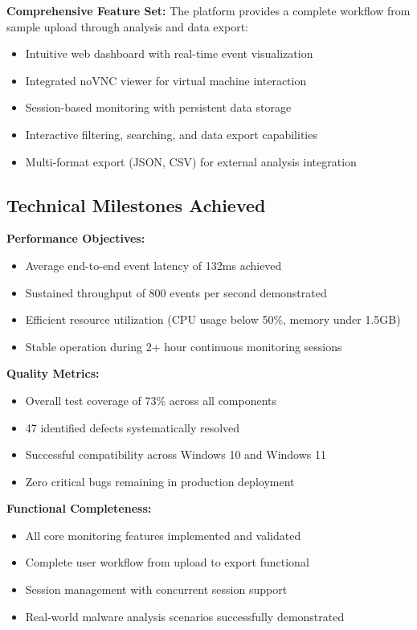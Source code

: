 \textbf{Comprehensive Feature Set:}
The platform provides a complete workflow from sample upload through analysis and data export:
\begin{itemize}
    \item Intuitive web dashboard with real-time event visualization
    \item Integrated noVNC viewer for virtual machine interaction
    \item Session-based monitoring with persistent data storage
    \item Interactive filtering, searching, and data export capabilities
    \item Multi-format export (JSON, CSV) for external analysis integration
\end{itemize}

\subsection{Technical Milestones Achieved}

\textbf{Performance Objectives:}
\begin{itemize}
    \item Average end-to-end event latency of 132ms achieved
    \item Sustained throughput of 800 events per second demonstrated
    \item Efficient resource utilization (CPU usage below 50\%, memory under 1.5GB)
    \item Stable operation during 2+ hour continuous monitoring sessions
\end{itemize}

\textbf{Quality Metrics:}
\begin{itemize}
    \item Overall test coverage of 73\% across all components
    \item 47 identified defects systematically resolved
    \item Successful compatibility across Windows 10 and Windows 11
    \item Zero critical bugs remaining in production deployment
\end{itemize}

\textbf{Functional Completeness:}
\begin{itemize}
    \item All core monitoring features implemented and validated
    \item Complete user workflow from upload to export functional
    \item Session management with concurrent session support
    \item Real-world malware analysis scenarios successfully demonstrated
\end{itemize}

